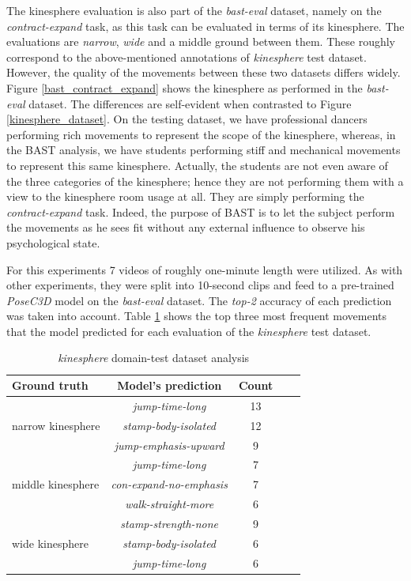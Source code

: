 \documentclass[extern,palatino]{cgMA}
\begin{document}
\noindent The kinesphere evaluation is also part of the \textit{bast-eval} dataset, namely on the \textit{contract-expand} task, as this task can be evaluated in terms of its kinesphere. The evaluations are \textit{narrow}, \textit{wide} and a middle ground between them. These roughly correspond to the above-mentioned annotations of \textit{kinesphere} test dataset. However, the quality of the movements between these two datasets differs widely. Figure \ref{bast_contract_expand} shows the kinesphere as performed in the \textit{bast-eval} dataset. The differences are self-evident when contrasted to Figure \ref{kinesphere_dataset}. On the testing dataset, we have professional dancers performing rich movements to represent the scope of the kinesphere, whereas, in the BAST analysis, we have students performing stiff and mechanical movements to represent this same kinesphere. Actually, the students are not even aware of the three categories of the kinesphere; hence they are not performing them with a view to the kinesphere room usage at all. They are simply performing the \textit{contract-expand} task. Indeed, the purpose of BAST is to let the subject perform the movements as he sees fit without any external influence to observe his psychological state.

For this experiments 7 videos of roughly one-minute length were utilized. As with other experiments, they were split into 10-second clips and feed to a pre-trained \textit{PoseC3D} model on the \textit{bast-eval} dataset. The \textit{top-2} accuracy of each prediction was taken into account. Table \ref{tab:research_question_3_kinesphere} shows the top three most frequent movements that the model predicted for each evaluation of the \textit{kinesphere} test dataset.

\begin{table}[h!]
  \begin{center}
    \caption{\textit{kinesphere} domain-test dataset analysis}
    \label{tab:research_question_3_kinesphere}
    \begin{tabular}{l|c|c|c|c}
      \textbf{Ground truth} & \textbf{Model's prediction} & \textbf{Count}\\
      \hline
      \multirow{3}{*}{narrow kinesphere} & \textit{jump-time-long} & 13\\
       & \textit{stamp-body-isolated} & 12\\
       & \textit{jump-emphasis-upward} & 9\\
       \hline
       \multirow{3}{*}{middle kinesphere} & \textit{jump-time-long} & 7\\
       & \textit{con-expand-no-emphasis} & 7\\ 
       & \textit{walk-straight-more} & 6\\ 
        \hline
       \multirow{3}{*}{wide kinesphere} & \textit{stamp-strength-none} & 9\\
       & \textit{stamp-body-isolated} & 6\\ 
       & \textit{jump-time-long} & 6\\ 
    \end{tabular}
  \end{center}
\end{table}
\end{document}
